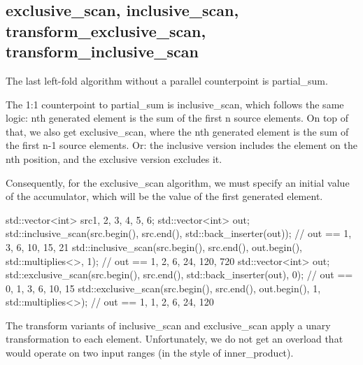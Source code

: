 \subsection{exclusive\_scan, inclusive\_scan, transform\_exclusive\_scan, transform\_inclusive\_scan}

The last left-fold algorithm without a parallel counterpoint is partial\_sum.



The 1:1 counterpoint to partial\_sum is inclusive\_scan, which follows the same logic: nth generated element is the sum of the first n source elements. On top of that, we also get exclusive\_scan, where the nth generated element is the sum of the first n-1 source elements. Or: the inclusive version includes the element on the nth position, and the exclusive version excludes it.

Consequently, for the exclusive\_scan algorithm, we must specify an initial value of the accumulator, which will be the value of the first generated element.

\begin{box-note}
\begin{cppcode}
std::vector<int> src{1, 2, 3, 4, 5, 6};
{
    std::vector<int> out;
    std::inclusive_scan(src.begin(), src.end(), std::back_inserter(out));
    // out == {1, 3, 6, 10, 15, 21}
    std::inclusive_scan(src.begin(), src.end(), out.begin(), std::multiplies<>{}, 1);
    // out == {1, 2, 6, 24, 120, 720}
}
{
    std::vector<int> out;
    std::exclusive_scan(src.begin(), src.end(), std::back_inserter(out), 0);
    // out == {0, 1, 3, 6, 10, 15}
    std::exclusive_scan(src.begin(), src.end(), out.begin(), 1, std::multiplies<>{});
    // out == {1, 1, 2, 6, 24, 120}
}
\end{cppcode}
\end{box-note}



The transform variants of inclusive\_scan and exclusive\_scan apply a unary transformation to each element. Unfortunately, we do not get an overload that would operate on two input ranges (in the style of inner\_product).


